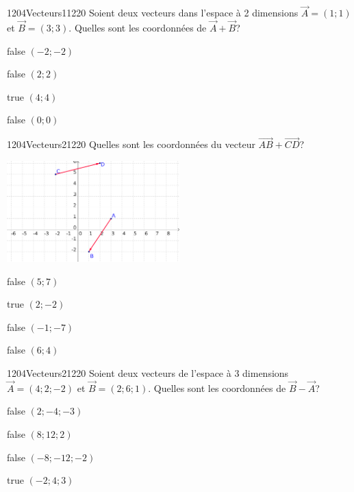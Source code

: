         	\begin{question}{1204}{Vecteurs}{1}{1220}
            	Soient deux vecteurs dans l'espace à 2 dimensions $\vec{A}=(1;1)$ et $\vec{B}=(3;3)$. Quelles sont les coordonnées de $\vec{A}+\vec{B}$?
            \end{question}
            \begin{reponses}
            	\item[false] $(-2;-2)$
            	\item[false] $(2;2)$
                \item[true] $(4;4)$
                \item[false] $(0;0)$
            \end{reponses}
            \begin{question}{1204}{Vecteurs}{2}{1220}
                Quelles sont les coordonnées du vecteur $\vec{AB}+\vec{CD}$?
                \begin{center}
                	\includegraphics[width=0.5\textwidth]{Philippe/Figures_Philippe/vecteurs_4_4.png}
                \end{center}
            \end{question}
            \begin{reponses}
                \item[false] $(5;7)$
                \item[true] $(2;-2)$
                \item[false] $(-1;-7)$
                \item[false] $(6;4)$
            \end{reponses}
            \begin{question}{1204}{Vecteurs}{2}{1220}
               Soient deux vecteurs de l'espace à 3 dimensions $\vec{A}=(4;2;-2)$ et $\vec{B}=(2;6;1)$. Quelles sont les coordonnées de $\vec{B}-\vec{A}$?
            \end{question}
            \begin{reponses}
                \item[false] $(2;-4;-3)$
                \item[false] $(8;12;2)$
                \item[false] $(-8;-12;-2)$
                \item[true] $(-2;4;3)$
            \end{reponses}
